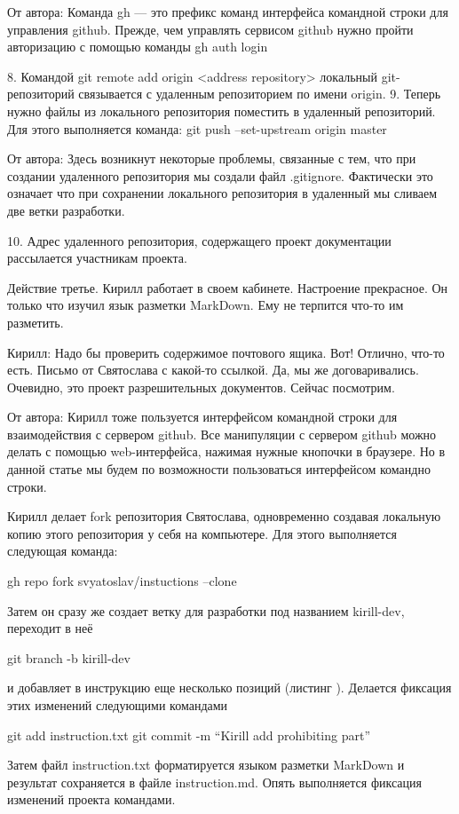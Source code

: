 От автора:
 Команда gh --- это префикс команд интерфейса командной строки для управления
github. Прежде, чем управлять сервисом github нужно пройти авторизацию с помощью команды
  gh auth login

8. Командой 
	git remote add origin <address repository>
локальный git-репозиторий связывается с удаленным репозиторием по имени origin.
9. Теперь нужно файлы из локального репозитория поместить в удаленный репозиторий. Для этого
выполняется команда:
	git push --set-upstream origin master

От автора:
Здесь возникнут некоторые проблемы, связанные с тем, что при создании 
удаленного репозитория мы создали файл .gitignore. Фактически это означает что 
при сохранении локального репозитория в удаленный мы сливаем две ветки разработки.

10. Адрес удаленного репозитория, содержащего проект документации рассылается участникам
проекта. 

Действие третье.
Кирилл работает в своем кабинете. Настроение прекрасное. Он только что изучил язык разметки
MarkDown. Ему не терпится что-то им разметить. 

Кирилл: Надо бы проверить содержимое почтового ящика. Вот! Отлично, что-то есть. 
Письмо от Святослава с какой-то ссылкой. Да, мы же договаривались. Очевидно, это проект
разрешительных документов. Сейчас посмотрим.

От автора: Кирилл тоже пользуется интерфейсом командной строки для взаимодействия с сервером
github. Все манипуляции с сервером github можно делать с помощью web-интерфейса, нажимая
нужные кнопочки в браузере. Но в данной статье мы будем по возможности пользоваться интерфейсом
командно строки. 

Кирилл делает fork репозитория Святослава, одновременно
создавая локальную копию этого репозитория у себя на компьютере. Для этого выполняется следующая
команда:

gh repo fork svyatoslav/instuctions --clone

Затем он сразу же создает ветку для разработки под названием kirill-dev, переходит в  неё 

git branch -b kirill-dev

и добавляет в инструкцию еще несколько позиций (листинг ).
Делается фиксация этих изменений следующими командами

git add instruction.txt
git commit -m ``Kirill add prohibiting part''

Затем файл instruction.txt форматируется языком разметки MarkDown и результат сохраняется в
файле instruction.md.
Опять выполняется фиксация изменений проекта командами. 

